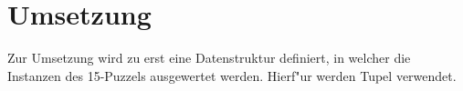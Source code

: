 \section{Umsetzung} %
\label{cha:Umsetzung}
Zur Umsetzung wird zu erst eine Datenstruktur definiert, in welcher die Instanzen des 15-Puzzels ausgewertet werden. Hierf"ur werden Tupel verwendet.
